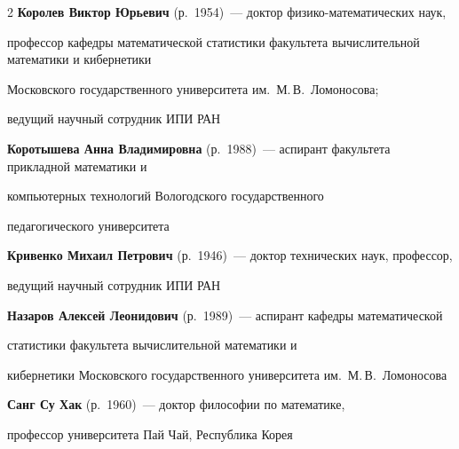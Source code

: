 \begin{multicols}{2}
\textbf{Королев Виктор Юрьевич} (р.\ 1954)~--- доктор фи\-зи\-ко-ма\-те\-ма\-ти\-че\-ских наук, 

профессор кафедры математической статистики факультета вычислительной математики и кибернетики 

Московского государ\-ст\-вен\-но\-го университета им.\ М.\,В.~Ломоносова; 

ведущий научный сотрудник ИПИ РАН



\vspace*{4pt}



\noindent

\textbf{Коротышева Анна Владимировна} (р.\ 1988)~--- аспирант факультета прикладной математики и 

компьютерных технологий Вологодского государственного

педагогического университета







\vspace*{4pt}



\noindent

\textbf{Кривенко Михаил Петрович} (р.\ 1946)~--- доктор технических наук, профессор, 

ведущий научный сотрудник ИПИ РАН



\vspace*{4pt}



\noindent

\textbf{Назаров Алексей Леонидович} (р.\ 1989)~--- аспирант кафедры математической

статистики факультета вычислительной математики и 

кибернетики Московского государственного университета им.\ М.\,В.~Ломоносова





\vspace*{4pt}







\noindent

\textbf{Санг Су Хак} (р.\ 1960)~--- доктор философии по математике,

профессор университета Пай Чай, Республика Корея




\end{multicols}
